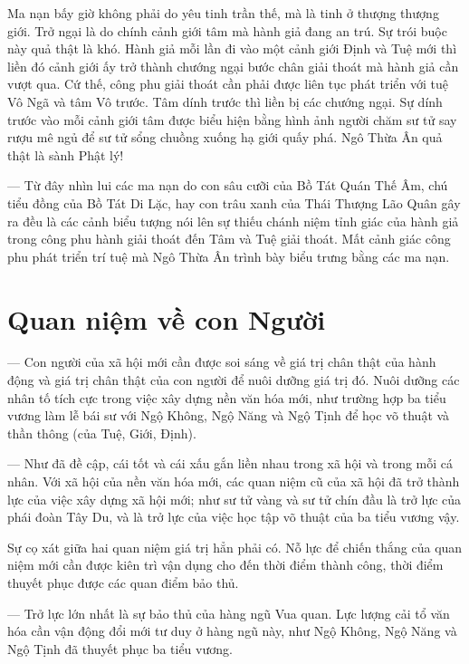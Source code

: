 Ma nạn bấy giờ không phải do yêu tinh trần thế, mà là tinh ở thượng thượng giới. Trở ngại là do chính cảnh giới tâm mà hành giả đang an trú. Sự trói buộc này quả thật là khó. Hành giả mỗi lần đi vào một cảnh giới Định và Tuệ mới thì liền đó cảnh giới ấy trở thành chướng ngại bước chân giải thoát mà hành giả cần vượt qua. Cứ thế, công phu giải thoát cần phải được liên tục phát triển với tuệ Vô Ngã và tâm Vô trước. Tâm dính trước thì liền bị các chướng ngại. Sự dính trước vào mỗi cảnh giới tâm được biểu hiện bằng hình ảnh người chăm sư tử say rượu mê ngủ để sư tử sổng chuồng xuống hạ giới quấy phá. Ngô Thừa Ân quả thật là sành Phật lý!

— Từ đây nhìn lui các ma nạn do con sâu cưỡi của Bồ Tát Quán Thế Âm, chú tiểu đồng của Bồ Tát Di Lặc, hay con trâu xanh của Thái Thượng Lão Quân gây ra đều là các cảnh biểu tượng nói lên sự thiếu chánh niệm tỉnh giác của hành giả trong công phu hành giải thoát đến Tâm và Tuệ giải thoát. Mất cảnh giác công phu phát triển trí tuệ mà Ngô Thừa Ân trình bày biểu trưng bằng các ma nạn.

\section{Quan niệm về con Người} %
\label{sec:88_89_90_con_nguoi}

— Con người của xã hội mới cần được soi sáng về giá trị chân thật của hành động và giá trị chân thật của con người để nuôi dưỡng giá trị đó. Nuôi dưỡng các nhân tố tích cực trong việc xây dựng nền văn hóa mới, như trường hợp ba tiểu vương làm lễ bái sư với Ngộ Không, Ngộ Năng và Ngộ Tịnh để học võ thuật và thần thông (của Tuệ, Giới, Định).

— Như đã đề cập, cái tốt và cái xấu gắn liền nhau trong xã hội và trong mỗi cá nhân. Với xã hội của nền văn hóa mới, các quan niệm cũ của xã hội đã trở thành lực của việc xây dựng xã hội mới; như sư tử vàng và sư tử chín đầu là trở lực của phái đoàn Tây Du, và là trở lực của việc học tập võ thuật của ba tiểu vương vậy.

Sự cọ xát giữa hai quan niệm giá trị hẳn phải có. Nỗ lực để chiến thắng của quan niệm mới cần được kiên trì vận dụng cho đến thời điểm thành công, thời điểm thuyết phục được các quan điểm bảo thủ.

— Trở lực lớn nhất là sự bảo thủ của hàng ngũ Vua quan. Lực lượng cải tổ văn hóa cần vận động đổi mới tư duy ở hàng ngũ này, như Ngộ Không, Ngộ Năng và Ngộ Tịnh đã thuyết phục ba tiểu vương.

